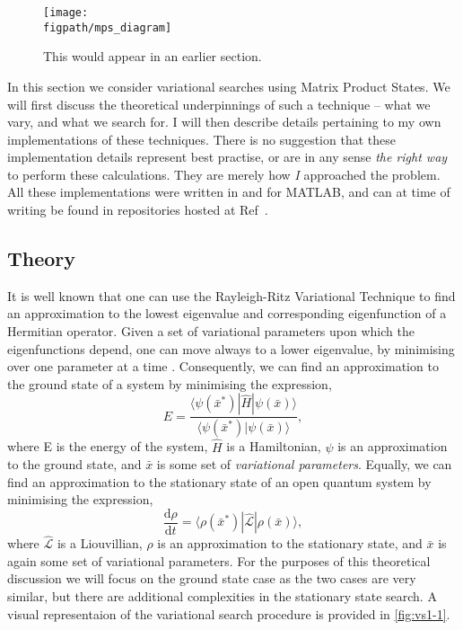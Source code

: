 \begin{figure}[h!]
\centering
\texttt{[image: \\figpath/mps\_diagram]}
\caption{This would appear in an earlier section.}
\label{fig:mps-diagram}
\end{figure}

In this section we consider variational searches using Matrix Product States. We will first discuss the theoretical underpinnings of such a technique -- what we vary, and what we search for. I will then describe details pertaining to my own implementations of these techniques. There is no suggestion that these implementation details represent best practise, or are in any sense \emph{the right way} to perform these calculations. They are merely how \emph{I} approached the problem. All these implementations were written in and for MATLAB, and can at time of writing be found in repositories hosted at Ref~\cite{otb:githome}.
 
 \subsection{Theory}
It is well known that one can use the Rayleigh-Ritz Variational Technique to find an approximation to the lowest eigenvalue and corresponding eigenfunction of a Hermitian operator. Given a set of variational parameters upon which the eigenfunctions depend, one can move always to a lower eigenvalue, by minimising over one parameter at a time \cite{ArfWeb_RRVT, Gasiorowicz_RVT}. Consequently, we can find an approximation to the ground state of a system by minimising the expression,
\begin{equation}
E = \frac{\langle \psi (\bar{x}^{*}) | \hat{H} | \psi (\bar{x}) \rangle}{\langle \psi (\bar{x}^{*}) | \psi (\bar{x}) \rangle},
\label{eq:vs1-1}
\end{equation}
where E is the energy of the system, \(\hat{H}\) is a Hamiltonian, \(\psi\) is an approximation to the ground state, and \( \bar{x} \) is some set of \emph{variational parameters}. Equally, we can find an approximation to the stationary state of an open quantum system by minimising the expression,
\begin{equation}
\frac{\mathrm{d}\rho}{\mathrm{d}t} = \langle \rho(\bar{x}^{*}) | \hat{\mathcal{L}} | \rho(\bar{x}) \rangle,
\label{eq:vs1-2}
\end{equation}
where \(\hat{\mathcal{L}}\) is a Liouvillian, \(\rho\) is an approximation to the stationary state, and \(\bar{x}\) is again some set of variational parameters. For the purposes of this theoretical discussion we will focus on the ground state case as the two cases are very similar, but there are additional complexities in the stationary state search. A visual representaion of the variational search procedure is provided in \cref{fig:vs1-1}.

